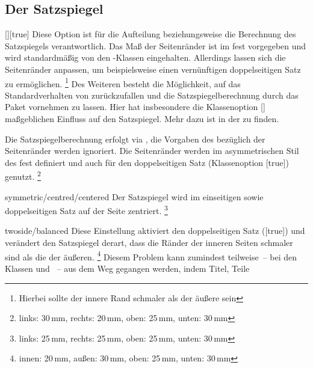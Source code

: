 \begin{Declaration*}{}
\begin{Declaration*}{}
\begin{Declaration*}{}
\subsection{Der Satzspiegel}
%
%
\begin{Declaration}[v2.03]{[\PSet]}[true]%
\printdeclarationlist%
%
%
%
Diese Option ist für die Aufteilung beziehungsweise die Berechnung des 
Satzspiegels verantwortlich. Das Maß der Seitenränder ist im \CD fest 
vorgegeben und wird standardmäßig von den \TUDScript-Klassen eingehalten. 
Allerdings lassen sich die Seitenränder anpassen, um beispielsweise einen 
vernünftigen doppelseitigen Satz zu ermöglichen.%
\footnote{Hierbei sollte der innere Rand schmaler als der äußere sein}
Des Weiteren besteht die Möglichkeit, auf das Standardverhalten von 
\KOMAScript{} zurückzufallen und die Satzspiegelberechnung durch das Paket
 vornehmen zu lassen. Hier hat insbesondere die Klassenoption 
[\PSet] maßgeblichen Einfluss auf den Satzspiegel. Mehr dazu ist in 
der  zu finden.
%
\begin{values}
\itemfalse
  Die Satzspiegelberechnung erfolgt via , die Vorgaben des 
  \CDs bezüglich der Seitenränder werden ignoriert.
\itemtrue*[asymmetric/cd]
  Die Seitenränder werden im asymmetrischen Stil des \CDs fest definiert und 
  auch für den doppelseitigen Satz (Klassenoption [true]) 
  genutzt.%
  \footnote{links: 30\,mm, rechts: 20\,mm, oben: 25\,mm, unten: 30\,mm}
\item[symmetric/centred/centered]
  Der Satzspiegel wird im einseitigen sowie doppelseitigen Satz auf der Seite 
  zentriert.%
  \footnote{links: 25\,mm, rechts: 25\,mm, oben: 25\,mm, unten: 30\,mm}
\item[twoside/balanced]
  Diese Einstellung aktiviert den doppelseitigen Satz ([true]) 
  und verändert den Satzspiegel derart, dass die Ränder der inneren Seiten 
  schmaler sind als die der äußeren.%
  \footnote{innen: 20\,mm, außen: 30\,mm, oben: 25\,mm, unten: 30\,mm}
  Diesem Problem kann zumindest teilweise~-- bei den Klassen  
  und ~-- aus dem Weg gegangen werden, indem Titel, Teile 

\end{values}
\end{Declaration}
\end{Declaration*}
\end{Declaration*}
\end{Declaration*}
